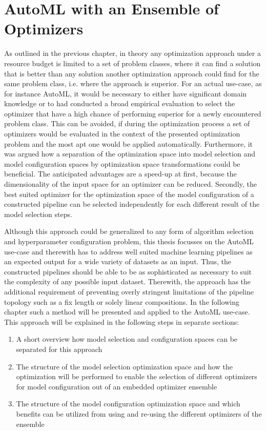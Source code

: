 %
\chapter{AutoML with an Ensemble of Optimizers}
\label{sec:approach}
As outlined in the previous chapter, in theory any optimization approach under a resource budget is limited to a set of problem classes, where it can find a solution that is better than any solution another optimization approach could find for the same problem class, i.e. where the approach is superior.
For an actual use-case, as for instance AutoML, it would be necessary to either have significant domain knowledge or to had conducted a broad empirical evaluation to select the optimizer that have a high chance of performing superior for a newly encountered problem class.
This can be avoided, if during the optimization process a set of optimizers would be evaluated in the context of the presented optimization problem and the most apt one would be applied automatically.\newline
Furthermore, it was argued how a separation of the optimization space into model selection and model configuration spaces by optimization space transformations could be beneficial.
The anticipated advantages are a speed-up at first, because the dimensionality of the input space for an optimizer can be reduced.
Secondly, the best suited optimizer for the optimization space of the model configuration of a constructed pipeline can be selected independently for each different result of the model selection steps.

Although this approach could be generalized to any form of algorithm selection and hyperparameter configuration problem, this thesis focusses on the AutoML use-case and therewith has to address well suited machine learning pipelines as an expected output for a wide variety of datasets as an input.
Thus, the constructed pipelines should be able to be as sophisticated as necessary to suit the complexity of any possible input dataset.
Therewith, the approach has the additional requirement of preventing overly stringent limitations of the pipeline topology such as a fix length or solely linear compositions.\newline
In the following chapter such a method will be presented and applied to the AutoML use-case.
This approach will be explained in the following steps in separate sections:
\begin{enumerate}
    \item A short overview how model selection and configuration spaces can be separated for this approach
    \item The structure of the model selection optimization space and how the optimization will be performed to enable the selection of different optimizers for model configuration out of an embedded optimizer ensemble
    \item The structure of the model configuration optimization space and which benefits can be utilized from using and re-using the different optimizers of the ensemble
\end{enumerate}

